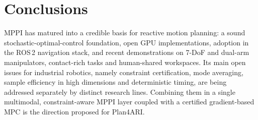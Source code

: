 \section{Conclusions}
MPPI has matured into a credible basis for reactive motion planning: a sound stochastic-optimal-control foundation, open GPU implementations, adoption in the ROS\,2 navigation stack, and recent demonstrations on 7-DoF and dual-arm manipulators, contact-rich tasks and human-shared workspaces. Its main open issues for industrial robotics, namely constraint certification, mode averaging, sample efficiency in high dimensions and deterministic timing, are being addressed separately by distinct research lines. Combining them in a single multimodal, constraint-aware MPPI layer coupled with a certified gradient-based MPC is the direction proposed for Plan4ARI.

\fi
